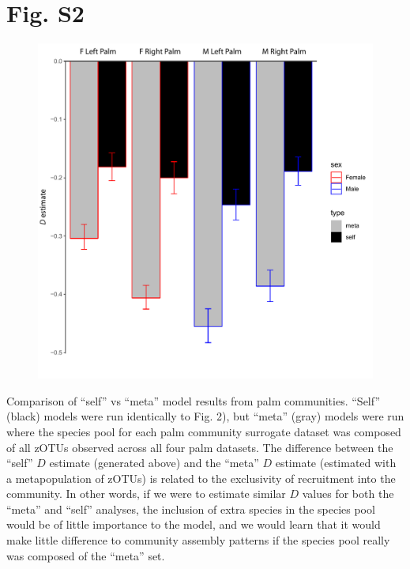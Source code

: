 \documentclass{article}
\begin{document}
\section*{Fig. S2}
\begin{figure}[ht]
	\centering
	\includegraphics[scale=0.80]{../Fig_S2.pdf}
\end{figure}
Comparison of “self” vs “meta” model results from palm communities. “Self” (black) models were run identically to Fig. 2), but “meta” (gray) models were run where the species pool for each palm community surrogate dataset was composed of all zOTUs observed across all four palm datasets. The difference between the “self” \(D\) estimate (generated above) and the “meta” \(D\) estimate (estimated with a metapopulation of zOTUs) is related to the exclusivity of recruitment into the community. In other words, if we were to estimate similar \(D\) values for both the “meta” and “self” analyses, the inclusion of extra species in the species pool would be of little importance to the model, and we would learn that it would make little difference to community assembly patterns if the species pool really was composed of the “meta” set.
\newpage
%
%
\end{document}
